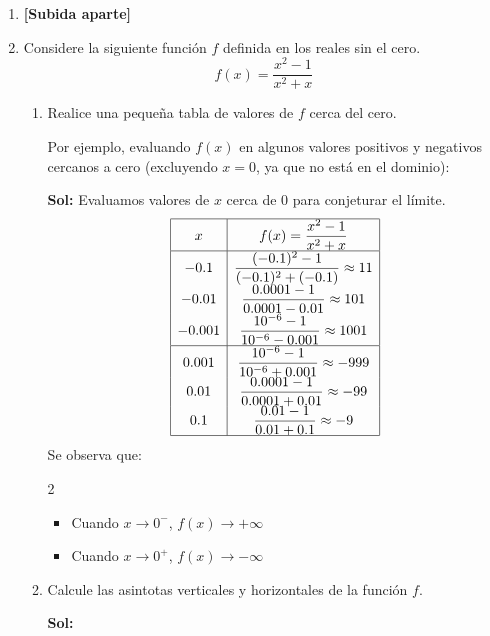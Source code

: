 \documentclass[letterpaper,12pt]{article}
\theoremstyle{plain}
\theoremstyle{definition}
\begin{document}
\begin{enumerate}
\item \textbf{[Subida aparte]}
\item Considere la siguiente función $f$ definida en los reales sin el cero.
$$f(x) = \dfrac{x^2-1}{x^2+x}$$
    \begin{enumerate}
        \item Realice una pequeña tabla de valores de $f$ cerca del cero.
        
  Por ejemplo, evaluando \( f(x) \) en algunos valores positivos y negativos cercanos a cero (excluyendo \( x = 0 \), ya que no está en el dominio):

\color{blue} \textbf{Sol:} Evaluamos valores de $x$ cerca de 0 para conjeturar el límite.
        \[
        \begin{array}{|c|c|}
        \hline
        x & f(x) = \dfrac{x^2 - 1}{x^2 + x} \\
        \hline
        -0.1 & \dfrac{(-0.1)^2 - 1}{(-0.1)^2 + (-0.1)}  \approx 11 \\
        -0.01 & \dfrac{0.0001 - 1}{0.0001 - 0.01}   \approx 101 \\
        -0.001 & \dfrac{10^{-6} - 1}{10^{-6} - 0.001}   \approx 1001 \\
        \hline
        0.001 & \dfrac{10^{-6} - 1}{10^{-6} + 0.001}  \approx -999 \\
        0.01 & \dfrac{0.0001 - 1}{0.0001 + 0.01} \approx -99 \\
        0.1 & \dfrac{0.01 - 1}{0.01 + 0.1}\approx -9 \\
        \hline
        \end{array}
        \]
        Se observa que:
        \begin{multicols}{2}
            \begin{itemize}
            \item Cuando \( x \to 0^- \), \( f(x) \to +\infty \)
            \item Cuando \( x \to 0^+ \), \( f(x) \to -\infty \)
        \end{itemize}
        \end{multicols}
\color{black}
        
        \item Calcule las asintotas verticales y horizontales de la función $f$.

\color{blue}
\textbf{Sol:} 


\end{enumerate}
\end{enumerate}
\end{document}
